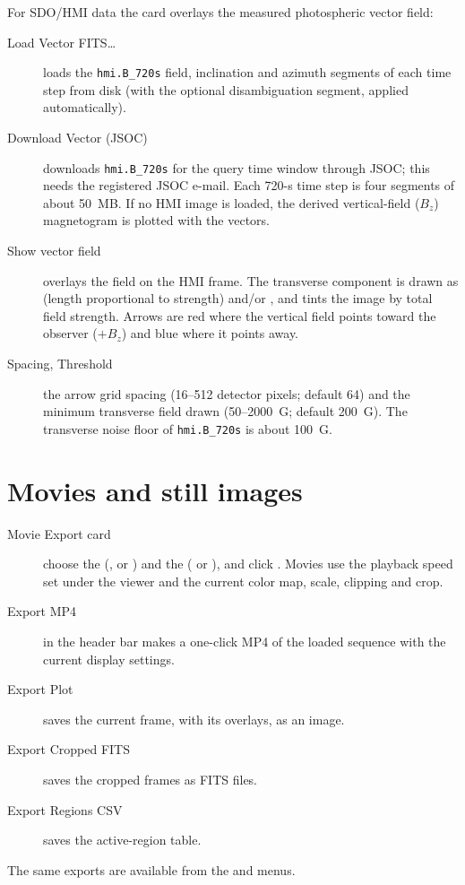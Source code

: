 For SDO/HMI data the  card overlays the measured
photospheric vector field:
\begin{description}
  \item[Load Vector FITS…] loads the \texttt{hmi.B\_720s} field, inclination and azimuth
    segments of each time step from disk (with the optional disambiguation segment, applied
    automatically).
  \item[Download Vector (JSOC)] downloads \texttt{hmi.B\_720s} for the query time window
    through JSOC; this needs the registered JSOC e-mail. Each 720-s time step is four segments
    of about 50~MB. If no HMI image is loaded, the derived vertical-field (\(B_z\))
    magnetogram is plotted with the vectors.
  \item[Show vector field] overlays the field on the HMI frame. The transverse component is
    drawn as  (length proportional to strength) and/or , and
     tints the image by total field strength. Arrows are red where the vertical
    field points toward the observer (\(+B_z\)) and blue where it points away.
  \item[Spacing, Threshold] the arrow grid spacing (16--512 detector pixels; default 64) and
    the minimum transverse field drawn (50--2000~G; default 200~G). The transverse noise floor
    of \texttt{hmi.B\_720s} is about 100~G.
\end{description}

\section{Movies and still images}
\label{sec:solar-movies}

\begin{description}
  \item[Movie Export card] choose the  (, 
    or ) and the  ( or ), and click
    . Movies use the playback speed set under the viewer and the current
    color map, scale, clipping and crop.
  \item[Export MP4] in the header bar makes a one-click MP4 of the loaded sequence with the
    current display settings.
  \item[Export Plot] saves the current frame, with its overlays, as an image.
  \item[Export Cropped FITS] saves the cropped frames as FITS files.
  \item[Export Regions CSV] saves the active-region table.
\end{description}
The same exports are available from the  and  menus.
